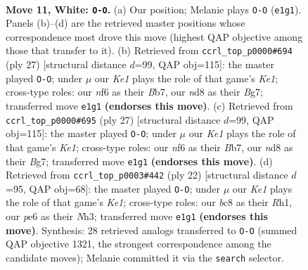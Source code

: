 \documentclass[11pt]{article}
\begin{document}
\clearpage

\begin{figure}[p]\centering
\begin{subfigure}{0.46\textwidth}\centering
\resizebox{\linewidth}{!}{%
\newchessgame
\chessboard[
  setfen={r1bn1r1k/1pppqppp/p3pn2/3P4/2P5/2B1PNP1/PP3PBP/R2QK2R w KQ - 1 11},
  showmover=false,
  pgfstyle=straightmove, color=movearrow, markmove={e1-g1}
]}
\caption{}
\end{subfigure}\hfill
\begin{subfigure}{0.46\textwidth}\centering
\resizebox{\linewidth}{!}{%
\newchessgame
\chessboard[
  setfen={r2qk2r/pb1p1pb1/4pn1p/2pP2p1/4P3/2NQ1NB1/PP3PPP/R4RK1 b kq - 3 14},
  showmover=false,
  pgfstyle=straightmove, color=movearrow, markmove={e8-g8}
]}
\caption{}
\end{subfigure}
\\[4pt]
\begin{subfigure}{0.46\textwidth}\centering
\resizebox{\linewidth}{!}{%
\newchessgame
\chessboard[
  setfen={r2qk2r/pb1p1pb1/4pn1p/2pP2p1/4P3/2NQ1NB1/PP3PPP/R4RK1 b kq - 3 14},
  showmover=false,
  pgfstyle=straightmove, color=movearrow, markmove={e8-g8}
]}
\caption{}
\end{subfigure}\hfill
\begin{subfigure}{0.46\textwidth}\centering
\resizebox{\linewidth}{!}{%
\newchessgame
\chessboard[
  setfen={rn3rk1/pp2qppp/3p1n2/3P1b2/4p3/P1B3PN/1P2PPBP/R2QK2R w KQ - 2 12},
  showmover=false,
  pgfstyle=straightmove, color=movearrow, markmove={e1-g1}
]}
\caption{}
\end{subfigure}
\caption{\textbf{Move 11, White: \texttt{O-O}.} (a) Our position; Melanie plays \texttt{O-O} (\texttt{e1g1}). Panels (b)--(d) are the retrieved master positions whose correspondence most drove this move (highest QAP objective among those that transfer to it). (b) Retrieved from \texttt{ccrl\_top\_p0000\#694} (ply 27) [structural distance $d$=99, QAP obj=115]: the master played \texttt{O-O}; under $\mu$ our \emph{Ke1} plays the role of that game's \emph{Ke1}; cross-type roles: our \emph{n}f6 as their \emph{B}b7, our \emph{n}d8 as their \emph{B}g7; transferred move \texttt{e1g1} \textbf{(endorses this move)}. (c) Retrieved from \texttt{ccrl\_top\_p0000\#695} (ply 27) [structural distance $d$=99, QAP obj=115]: the master played \texttt{O-O}; under $\mu$ our \emph{Ke1} plays the role of that game's \emph{Ke1}; cross-type roles: our \emph{n}f6 as their \emph{B}b7, our \emph{n}d8 as their \emph{B}g7; transferred move \texttt{e1g1} \textbf{(endorses this move)}. (d) Retrieved from \texttt{ccrl\_top\_p0003\#442} (ply 22) [structural distance $d$=95, QAP obj=68]: the master played \texttt{O-O}; under $\mu$ our \emph{Ke1} plays the role of that game's \emph{Ke1}; cross-type roles: our \emph{b}c8 as their \emph{R}h1, our \emph{p}e6 as their \emph{N}h3; transferred move \texttt{e1g1} \textbf{(endorses this move)}. Synthesis: 28 retrieved analogs transferred to \texttt{O-O} (summed QAP objective 1321, the strongest correspondence among the candidate moves); Melanie committed it via the \texttt{search} selector.}
\label{fig:thought-m20}
\end{figure}
\end{document}
